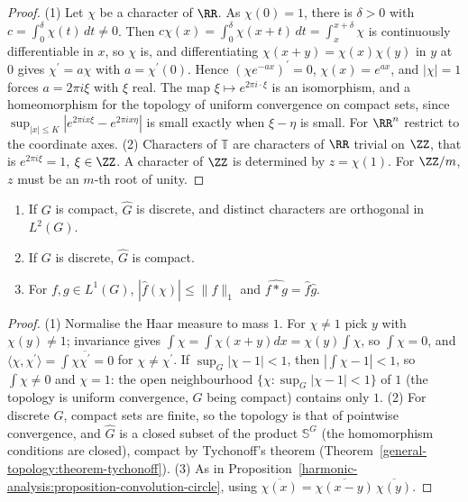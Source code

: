 \begin{proof}
(1) Let $\chi$ be a character of $\RR$. As $\chi(0) = 1$, there is $\delta > 0$ with $c = \int_0^\delta\chi(t)\,dt \neq 0$. Then $c\chi(x) = \int_0^\delta\chi(x + t)\,dt = \int_x^{x+\delta}\chi$ is continuously differentiable in $x$,
so $\chi$ is, and differentiating $\chi(x + y) = \chi(x)\chi(y)$ in $y$ at $0$ gives $\chi^{\prime} = a\chi$ with $a = \chi^{\prime}(0)$. Hence $(\chi e^{-ax})^{\prime} = 0$, $\chi(x) = e^{ax}$, and $|\chi| = 1$ forces $a = 2\pi i\xi$ with $\xi$ real.
The map $\xi \mapsto e^{2\pi i\cdot\xi}$ is an isomorphism, and a homeomorphism for the topology of uniform convergence on compact sets, since $\sup_{|x| \leq K}|e^{2\pi ix\xi} - e^{2\pi ix\eta}|$ is small exactly when $\xi - \eta$ is small.
For $\RR^n$ restrict to the coordinate axes. (2) Characters of $\mathbb{T}$ are characters of $\RR$ trivial on $\ZZ$, that is $e^{2\pi i\xi} = 1$, $\xi \in \ZZ$. A character of $\ZZ$ is determined by $z = \chi(1)$. For $\ZZ/m$, $z$ must
be an $m$-th root of unity.
\end{proof}

\begin{proposition}\label{harmonic-analysis:proposition-dual-compact-discrete}
\begin{enumerate}
\item If $G$ is compact, $\widehat G$ is discrete, and distinct characters are orthogonal in $L^2(G)$.
\item If $G$ is discrete, $\widehat G$ is compact.
\item For $f, g \in L^1(G)$, $|\hat f(\chi)| \leq \|f\|_1$ and $\widehat{f * g} = \hat f\hat g$.
\end{enumerate}
\end{proposition}

\begin{proof}
(1) Normalise the Haar measure to mass $1$. For $\chi \neq 1$ pick $y$ with $\chi(y) \neq 1$; invariance gives $\int\chi = \int\chi(x + y)dx = \chi(y)\int\chi$, so $\int\chi = 0$, and $\langle\chi, \chi^{\prime}\rangle = \int\chi\overline{\chi^{\prime}} = 0$
for $\chi \neq \chi^{\prime}$. If $\sup_G|\chi - 1| < 1$, then $|\int\chi - 1| < 1$, so $\int\chi \neq 0$ and $\chi = 1$: the open neighbourhood $\{\chi : \sup_G|\chi - 1| < 1\}$ of $1$ (the topology is uniform convergence, $G$
being compact) contains only $1$. (2) For discrete $G$, compact sets are finite, so the topology is that of pointwise convergence, and $\widehat G$ is a closed subset of the product $\mathbb{S}^G$ (the homomorphism conditions are
closed), compact by Tychonoff's theorem (Theorem~\ref{general-topology:theorem-tychonoff}). (3) As in Proposition~\ref{harmonic-analysis:proposition-convolution-circle}, using $\overline{\chi(x)} = \overline{\chi(x - y)}\,\overline{\chi(y)}$.
\end{proof}

